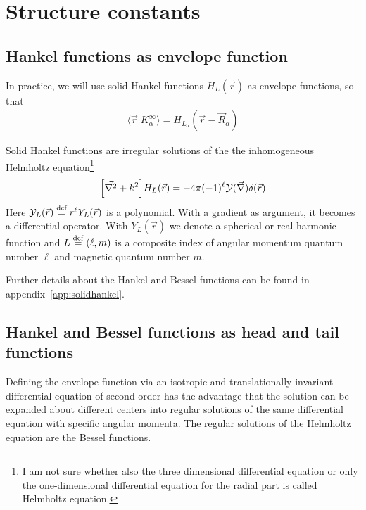 \documentclass[11pt,a4paper]{report}
\begin{document}
\section{Structure constants}
\subsection{Hankel functions as envelope function}
In practice, we will use solid Hankel functions $H_L(\vec{r})$ as
envelope functions, so that 
\begin{eqnarray}
\langle\vec{r}|K^\infty_\alpha\rangle= H_{L_\alpha}(\vec{r}-\vec{R}_\alpha)
\end{eqnarray}


Solid Hankel functions are irregular solutions of the the
inhomogeneous Helmholtz equation\footnote{I am not sure whether also
  the three dimensional differential equation or only the
  one-dimensional differential equation for the radial part is called
  Helmholtz equation.}
\begin{eqnarray}
\Bigl[\vec{\nabla^2}+k^2\Bigr]H_{L}(\vec{r})
=-4\pi(-1)^\ell\mathcal{Y}(\vec{\nabla})\delta(\vec{r})
\label{eq:solidhelmholtzequation}
\end{eqnarray}
Here $\mathcal{Y}_L(\vec{r})\stackrel{\text{def}}{=} r^\ell Y_L(\vec{r})$ is a
polynomial. With a gradient as argument, it becomes a differential
operator. With $Y_L(\vec{r})$ we denote a spherical or real harmonic
function and $L\stackrel{\text{def}}{=}(\ell,m)$ is a composite index of angular
momentum quantum number $\ell$ and magnetic quantum number $m$.

Further details about the Hankel and Bessel functions can be found in
appendix~\ref{app:solidhankel}.

\subsection{Hankel and Bessel functions as head and tail functions}
Defining the envelope function via an isotropic and translationally
invariant differential equation of second order has the advantage
that the solution can be expanded about different centers into regular
solutions of the same differential equation with specific angular
momenta. The regular solutions of the Helmholtz equation are the
Bessel functions.
\end{document}
